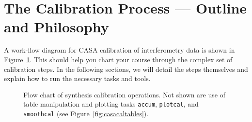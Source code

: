 \section{The Calibration Process --- Outline and Philosophy}
\label{section:cal.flow}

A work-flow diagram for CASA calibration of interferometry data is
shown in Figure~\ref{fig:casacalflow}.  This should help you chart
your course through the complex set of calibration steps.  In the
following sections, we will detail the steps themselves and explain
how to run the necessary tasks and tools.

\begin{figure}[h!]
\begin{center}
\caption{\label{fig:casacalflow}
Flow chart of synthesis calibration operations. Not shown are
use of table manipulation and plotting tasks {\tt accum}, 
{\tt plotcal}, and {\tt smoothcal} 
(see Figure~\ref{fig:casacaltables}).  }
\hrulefill
\end{center}
\end{figure}

